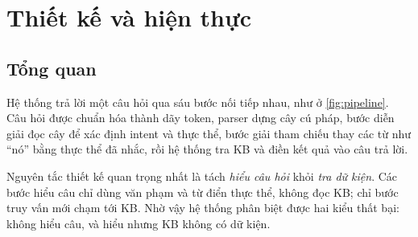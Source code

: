 \section{Thiết kế và hiện thực}
\label{sec:arch}

\subsection{Tổng quan}

Hệ thống trả lời một câu hỏi qua sáu bước nối tiếp nhau, như ở \cref{fig:pipeline}. Câu hỏi
được chuẩn hóa thành dãy token, parser dựng cây cú pháp, bước diễn giải đọc cây để xác định
intent và thực thể, bước giải tham chiếu thay các từ như ``nó'' bằng thực thể đã nhắc, rồi
hệ thống tra KB và điền kết quả vào câu trả lời.

Nguyên tắc thiết kế quan trọng nhất là tách \emph{hiểu câu hỏi} khỏi \emph{tra dữ kiện}. Các
bước hiểu câu chỉ dùng văn phạm và từ điển thực thể, không đọc KB; chỉ bước truy vấn mới chạm
tới KB. Nhờ vậy hệ thống phân biệt được hai kiểu thất bại: không hiểu câu, và hiểu nhưng KB
không có dữ kiện.

